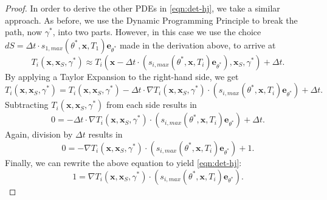 \documentclass[10pt,a4paper]{amsart}
\def \be{{\mathbf {e}}}
\def \bx{{\mathbf {x}}}
\begin{document}
\begin{proof}
In order to derive the other PDEs in \eqref{eqn:det-hj}, we take a similar approach. As before, we use the Dynamic Programming Principle to break the path, now $\gamma^*$, into two parts.  However, in this case we use the choice $dS = \Delta t \cdot s_{1,max}(\theta^*,\bx,T_1)\be_{\theta^*}$
made in the derivation above, to arrive at  
\begin{equation}
        T_i(\bx,\bx_S,\gamma^*) \approx T_i(\bx-\Delta t \cdot (s_{i,max}(\theta^*,\bx,T_i)\be_{\theta^*}),\bx_S,\gamma^*) + \Delta t.
\end{equation}
By applying a Taylor Expansion to the right-hand side, we get
\begin{equation}
        T_i(\bx,\bx_S,\gamma^*) = T_i(\bx,\bx_S,\gamma^*) - \Delta t \cdot \nabla T_i(\bx,\bx_S,\gamma^*) \cdot (s_{i,max}(\theta^*,\bx,T_i)\be_{\theta^*}) + \Delta t.
\end{equation}
Subtracting $T_i(\bx,\bx_S,\gamma^*)$ from each side results in
\begin{equation}
        0 = - \Delta t \cdot \nabla T_i(\bx,\bx_S,\gamma^*) \cdot (s_{i,max}(\theta^*,\bx,T_i)\be_{\theta^*}) + \Delta t.
\end{equation}
Again, division by $\Delta t$ results in
    \begin{equation}
        0 =- \nabla T_i(\bx,\bx_S,\gamma^*) \cdot (s_{i,max}(\theta^*,\bx,T_i)\be_{\theta^*}) + 1.
    \end{equation}
Finally, we can rewrite the above equation to yield \eqref{eqn:det-hj}:
    \begin{equation}
        1 = \nabla T_i(\bx,\bx_S,\gamma^*) \cdot (s_{i,max}(\theta^*,\bx,T_i)\be_{\theta^*}).
    \end{equation}
\end{proof}
\end{document}
